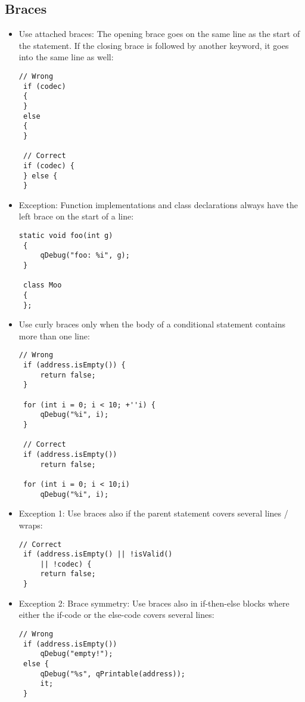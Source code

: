 \documentclass[a4paper,12pt]{article}
\begin{document}
\subsection{Braces}
\begin{itemize}
\item Use attached braces: The opening brace goes on the same line as the start of the statement. If the closing brace is followed by another keyword, it goes into the same line as well:
\begin{lstlisting}[breaklines]
 // Wrong
 if (codec)
 {
 }
 else
 {
 }
 
 // Correct
 if (codec) {
 } else {
 }
 \end{lstlisting}
\item Exception: Function implementations and class declarations always have the left brace on the start of a line:
\begin{lstlisting}[breaklines]
 static void foo(int g)
 {
     qDebug("foo: %i", g);
 }
 
 class Moo
 {
 };
 \end{lstlisting}
\item Use curly braces only when the body of a conditional statement contains more than one line:
\begin{lstlisting}[breaklines]
 // Wrong
 if (address.isEmpty()) {
     return false;
 }
 
 for (int i = 0; i < 10; +''i) {
     qDebug("%i", i);
 }
 
 // Correct
 if (address.isEmpty())
     return false;
 
 for (int i = 0; i < 10;i)
     qDebug("%i", i);
 \end{lstlisting}
\item Exception 1: Use braces also if the parent statement covers several lines / wraps:
\begin{lstlisting}[breaklines]
 // Correct
 if (address.isEmpty() || !isValid()
     || !codec) {
     return false;
 }
  \end{lstlisting}
\item Exception 2: Brace symmetry: Use braces also in if-then-else blocks where either the if-code or the else-code covers several lines:
\begin{lstlisting}[breaklines]
// Wrong
 if (address.isEmpty())
     qDebug("empty!");
 else {
     qDebug("%s", qPrintable(address));
     it;
 }
 

\end{lstlisting}
\end{itemize}
\end{document}
